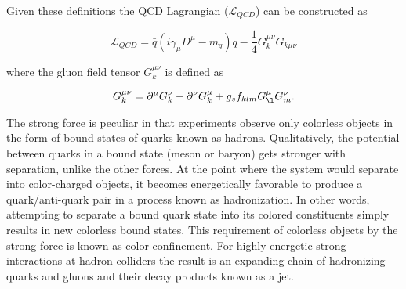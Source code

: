 Given these definitions the QCD Lagrangian ($\mathcal{L}_{QCD}$) can be
constructed as 

\begin{equation} \label{eq:qcd:qcd_lagrangian}
\mathcal{L}_{QCD} = \bar{q}(i\gamma_{\mu}D^{\mu} - m_{q})q -
\frac{1}{4}G_{k}^{\mu\nu}G_{k\mu\nu}
\end{equation}

where the gluon field tensor $G_{k}^{\mu\nu}$ is defined as

\begin{equation} \label{eq:qcd:gluon_tensor}
G_{k}^{\mu\nu} = \partial^{\mu}G_{k}^{\nu} - \partial^{\nu}G_{k}^{\mu} +
g_{s}f_{klm}G_{\l}^{\mu}G_{m}^{\nu}.
\end{equation}

The strong force is peculiar in that experiments observe only colorless objects
in the form of bound states of quarks known as hadrons.  Qualitatively, the
potential between quarks in a bound state (meson or baryon) gets stronger with
separation, unlike the other forces.  At the point where the system would
separate into color-charged objects, it becomes energetically favorable to
produce a quark/anti-quark pair in a process known as hadronization.  In other
words, attempting to separate a bound quark state into its colored constituents
simply results in new colorless bound states.  This requirement of colorless
objects by the strong force is known as color confinement. For highly energetic
strong interactions at hadron colliders the result is an expanding chain of
hadronizing quarks and gluons and their decay products known as a jet.

